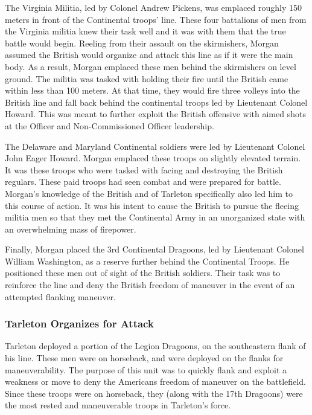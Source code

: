 The Virginia Militia, led by Colonel Andrew Pickens, was emplaced roughly 150
meters in front of the Continental troops' line.  These four battalions of men
from the Virginia militia knew their task well and it was with them that the
true battle would begin.  Reeling from their assault on the skirmishers, Morgan
assumed the British would organize and attack this line as if it were the main
body.  As a result, Morgan emplaced these men behind the skirmishers on level
ground.  The militia was tasked with holding their fire until the British came
within less than 100 meters.  At that time, they would fire three volleys into
the British line and fall back behind the continental troops led by Lieutenant
Colonel Howard.  This was meant to further exploit the British offensive with
aimed shots at the Officer and Non-Commissioned Officer leadership.  

The Delaware and Maryland Continental soldiers were led by Lieutenant Colonel
John Eager Howard.  Morgan emplaced these troops on slightly elevated terrain.
It was these troops who were tasked with facing and destroying the British
regulars.  These paid troops had seen combat and were prepared for battle.
Morgan’s knowledge of the British and of Tarleton specifically also led him to
this course of action.  It was his intent to cause the British to pursue the
fleeing militia men so that they met the Continental Army in an unorganized
state with an overwhelming mass of firepower.

Finally, Morgan placed the 3rd Continental Dragoons, led by Lieutenant Colonel
William Washington, as a reserve further behind the Continental Troops.  He
positioned these men out of sight of the British soldiers.  Their task was to
reinforce the line and deny the British freedom of maneuver in the event of an
attempted flanking maneuver. 

\subsubsection{Tarleton Organizes for Attack}

Tarleton deployed a portion of the Legion Dragoons, on the southeastern flank of
his line.  These men were on horseback, and were deployed on the flanks for
maneuverability.  The purpose of this unit was to quickly flank and exploit a
weakness or move to deny the Americans freedom of maneuver on the battlefield.
Since these troops were on horseback, they (along with the 17th Dragoons) were
the most rested and maneuverable troops in Tarleton’s force.   

